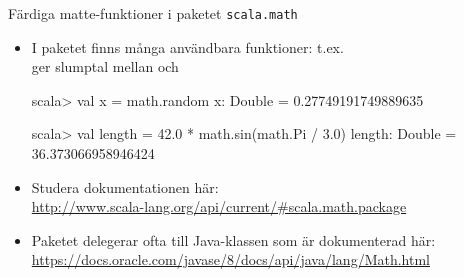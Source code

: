 \begin{Slide}{Färdiga matte-funktioner i paketet \texttt{scala.math}}\SlideFontSmall
\begin{itemize}
\item I paketet \texttt{} finns många användbara funktioner: t.ex.\\
 ger slumptal mellan  och 
\begin{REPLnonum}
scala> val x = math.random
x: Double = 0.27749191749889635

scala> val length = 42.0 * math.sin(math.Pi / 3.0)
length: Double = 36.373066958946424
\end{REPLnonum}

\item Studera dokumentationen här: \\{\SlideFontTiny
\url{http://www.scala-lang.org/api/current/#scala.math.package}}

\item Paketet  delegerar ofta till Java-klassen \texttt{} som är dokumenterad här: \\{\SlideFontTiny
\url{https://docs.oracle.com/javase/8/docs/api/java/lang/Math.html}}

\end{itemize}
\end{Slide}




